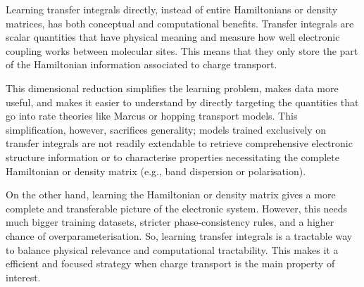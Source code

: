 Learning transfer integrals directly, instead of entire Hamiltonians or density matrices, has both conceptual and computational benefits. 
Transfer integrals are scalar quantities that have physical meaning and measure how well electronic coupling works between molecular sites. This means that they only store the part of the Hamiltonian information associated to charge transport. 

This dimensional reduction simplifies the learning problem, makes data more useful, and makes it easier to understand by directly targeting the quantities that go into rate theories like Marcus or hopping transport models. This simplification, however, sacrifices generality; models trained exclusively on transfer integrals are not readily extendable to retrieve comprehensive electronic structure information or to characterise properties necessitating the complete Hamiltonian or density matrix (e.g., band dispersion or polarisation). 

On the other hand, learning the Hamiltonian or density matrix gives a more complete and transferable picture of the electronic system. However, this needs much bigger training datasets, stricter phase-consistency rules, and a higher chance of overparameterisation. 
So, learning transfer integrals is a tractable way to balance physical relevance and computational tractability. This makes it a efficient and focused strategy when charge transport is the main property of interest.



